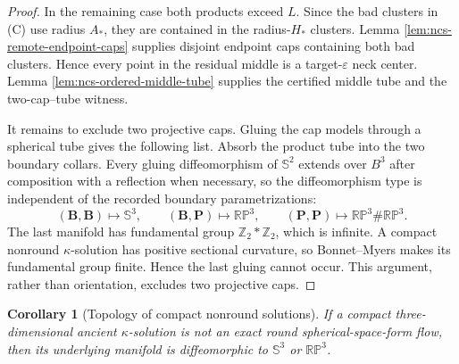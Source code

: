 \documentclass[10pt]{coll-l}
\newcommand{\Sph}{\mathbb{S}}
\newtheorem{corollary}[theorem]{Corollary}
\theoremstyle{definition}
\theoremstyle{remark}
\numberwithin{section}{chapter}
\numberwithin{equation}{chapter}
\begin{document}
\begin{proof}
In the remaining case both products exceed $L$.  Since the bad clusters
in (C) use radius $A_*$, they are contained in the radius-$H_*$ clusters.
Lemma
\ref{lem:ncs-remote-endpoint-caps} supplies disjoint endpoint caps
containing both bad clusters.  Hence every point in the residual middle is
a target-$\varepsilon$ neck center.  Lemma
\ref{lem:ncs-ordered-middle-tube} supplies the certified middle tube and
the two-cap--tube witness.

It remains to exclude two projective caps.  Gluing the cap models through a
spherical tube gives the following list.  Absorb the product tube into the
two boundary collars.  Every gluing diffeomorphism of $\Sph^2$ extends over
$B^3$ after composition with a reflection when necessary, so the
diffeomorphism type is independent of the recorded boundary
parametrizations:
\begin{equation}
 (\mathbf B,\mathbf B)\mapsto\Sph^3,\qquad
 (\mathbf B,\mathbf P)\mapsto\mathbb{RP}^3,\qquad
 (\mathbf P,\mathbf P)\mapsto
            \mathbb{RP}^3\#\mathbb{RP}^3.             \label{eq:ncs-cap-gluing-list}
\end{equation}
The last manifold has fundamental group
$\mathbb Z_2*\mathbb Z_2$, which is infinite.  A compact nonround
$\kappa$-solution has positive sectional curvature, so Bonnet--Myers makes
its fundamental group finite.  Hence the last gluing cannot occur.  This
argument, rather than orientation, excludes two projective caps.
\end{proof}

\begin{corollary}[Topology of compact nonround solutions]
\label{cor:ncs-compact-topology}
If a compact three-dimensional ancient $\kappa$-solution is not an exact
round spherical-space-form flow, then its underlying manifold is
diffeomorphic to $\Sph^3$ or $\mathbb{RP}^3$.
\end{corollary}
\end{document}
